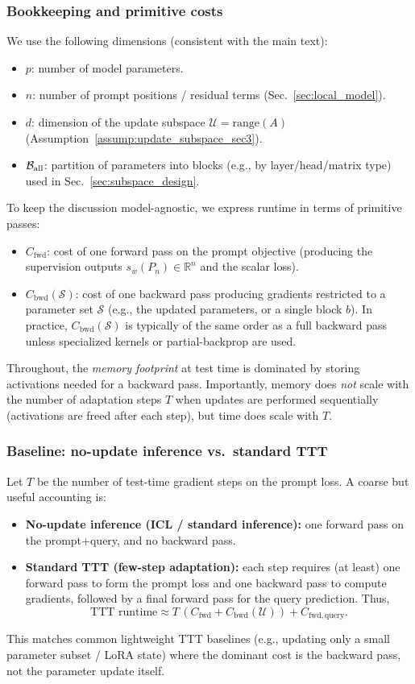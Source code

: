\documentclass{article}
\theoremstyle{plain}
\theoremstyle{definition}
\theoremstyle{remark}
\begin{document}
\subsubsection{Bookkeeping and primitive costs}
We use the following dimensions (consistent with the main text):
\begin{itemize}
\item $p$: number of model parameters.
\item $n$: number of prompt positions / residual terms (Sec.~\ref{sec:local_model}).
\item $d$: dimension of the update subspace $\mathcal U=\mathrm{range}(A)$ (Assumption~\ref{assump:update_subspace_sec3}).
\item $\mathcal{B}_{\rm all}$: partition of parameters into blocks (e.g., by layer/head/matrix type)
used in Sec.~\ref{sec:subspace_design}.
\end{itemize}

To keep the discussion model-agnostic, we express runtime in terms of primitive passes:
\begin{itemize}
\item $C_{\mathrm{fwd}}$: cost of one forward pass on the prompt objective (producing the supervision outputs
$s_w(P_n)\in\mathbb{R}^n$ and the scalar loss).
\item $C_{\mathrm{bwd}}(\mathcal{S})$: cost of one backward pass producing gradients restricted to a parameter set
$\mathcal{S}$ (e.g., the updated parameters, or a single block $b$).
In practice, $C_{\mathrm{bwd}}(\mathcal{S})$ is typically of the same order as a full backward pass unless
specialized kernels or partial-backprop are used.
\end{itemize}

Throughout, the \emph{memory footprint} at test time is dominated by storing activations needed for a backward pass.
Importantly, memory does \emph{not} scale with the number of adaptation steps $T$ when updates are performed
sequentially (activations are freed after each step), but time does scale with $T$.

\subsubsection{Baseline: no-update inference vs.\ standard TTT}
Let $T$ be the number of test-time gradient steps on the prompt loss.
A coarse but useful accounting is:
\begin{itemize}
\item \textbf{No-update inference (ICL / standard inference):}
one forward pass on the prompt+query, and no backward pass.
\item \textbf{Standard TTT (few-step adaptation):}
each step requires (at least) one forward pass to form the prompt loss and one backward pass to compute gradients,
followed by a final forward pass for the query prediction. Thus,
\[
\text{TTT runtime} \approx T\,(C_{\mathrm{fwd}}+C_{\mathrm{bwd}}(\mathcal U)) + C_{\mathrm{fwd,query}}.
\]
\end{itemize}
This matches common lightweight TTT baselines (e.g., updating only a small parameter subset / LoRA state)
where the dominant cost is the backward pass, not the parameter update itself.
\end{document}
